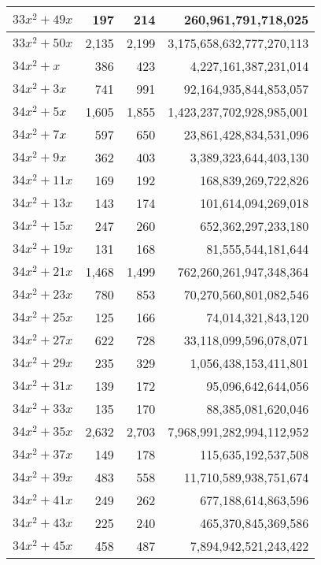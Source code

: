 \documentclass[a4paper]{amsproc}
\theoremstyle{plain}
\theoremstyle{named}
\begin{document}
\begin{longtable}{ | l | r | r | r | }
$33x^2 + 49x$ & 197 & 214 & 260{,}961{,}791{,}718{,}025 \\ \hline
$33x^2 + 50x$ & 2{,}135 & 2{,}199 & 3{,}175{,}658{,}632{,}777{,}270{,}113 \\ \hline
$34x^2 + x$ & 386 & 423 & 4{,}227{,}161{,}387{,}231{,}014 \\ \hline
$34x^2 + 3x$ & 741 & 991 & 92{,}164{,}935{,}844{,}853{,}057 \\ \hline
$34x^2 + 5x$ & 1{,}605 & 1{,}855 & 1{,}423{,}237{,}702{,}928{,}985{,}001 \\ \hline
$34x^2 + 7x$ & 597 & 650 & 23{,}861{,}428{,}834{,}531{,}096 \\ \hline
$34x^2 + 9x$ & 362 & 403 & 3{,}389{,}323{,}644{,}403{,}130 \\ \hline
$34x^2 + 11x$ & 169 & 192 & 168{,}839{,}269{,}722{,}826 \\ \hline
$34x^2 + 13x$ & 143 & 174 & 101{,}614{,}094{,}269{,}018 \\ \hline
$34x^2 + 15x$ & 247 & 260 & 652{,}362{,}297{,}233{,}180 \\ \hline
$34x^2 + 19x$ & 131 & 168 & 81{,}555{,}544{,}181{,}644 \\ \hline
$34x^2 + 21x$ & 1{,}468 & 1{,}499 & 762{,}260{,}261{,}947{,}348{,}364 \\ \hline
$34x^2 + 23x$ & 780 & 853 & 70{,}270{,}560{,}801{,}082{,}546 \\ \hline
$34x^2 + 25x$ & 125 & 166 & 74{,}014{,}321{,}843{,}120 \\ \hline
$34x^2 + 27x$ & 622 & 728 & 33{,}118{,}099{,}596{,}078{,}071 \\ \hline
$34x^2 + 29x$ & 235 & 329 & 1{,}056{,}438{,}153{,}411{,}801 \\ \hline
$34x^2 + 31x$ & 139 & 172 & 95{,}096{,}642{,}644{,}056 \\ \hline
$34x^2 + 33x$ & 135 & 170 & 88{,}385{,}081{,}620{,}046 \\ \hline
$34x^2 + 35x$ & 2{,}632 & 2{,}703 & 7{,}968{,}991{,}282{,}994{,}112{,}952 \\ \hline
$34x^2 + 37x$ & 149 & 178 & 115{,}635{,}192{,}537{,}508 \\ \hline
$34x^2 + 39x$ & 483 & 558 & 11{,}710{,}589{,}938{,}751{,}674 \\ \hline
$34x^2 + 41x$ & 249 & 262 & 677{,}188{,}614{,}863{,}596 \\ \hline
$34x^2 + 43x$ & 225 & 240 & 465{,}370{,}845{,}369{,}586 \\ \hline
$34x^2 + 45x$ & 458 & 487 & 7{,}894{,}942{,}521{,}243{,}422 \\ \hline

\end{longtable}
\end{document}
